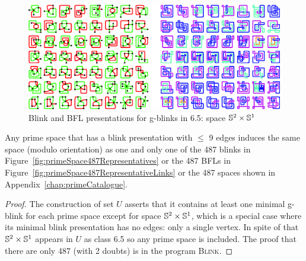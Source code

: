 \begin{figure}[h!tp]
   \begin{center}
      \leavevmode
      \includegraphics[width=14cm]{A.figs/gblinksfors1xs2inu.eps}
   \end{center}
   \vspace{-0.7cm}
   \caption{ Blink and BFL presentations for g-blinks in 6.5: space $\mathbb{S}^2 \times \mathbb{S}^1$}
   \label{fig:gblinksForS1xS2inU}
\end{figure}


\begin{Theo}
\label{theo:primeSpacesUpTo9Edges}
Any prime space that has a blink presentation with $\leq$ 9 edges induces the
same space (modulo orientation) as one and only one of the 487 blinks in
Figure~\ref{fig:primeSpace487Representatives} or the 487 BFLs in
Figure~\ref{fig:primeSpace487RepresentativeLinks} or the 487 spaces shown
in Appendix~\ref{chap:primeCatalogue}.
\end{Theo}

\enlargethispage{2cm}

\begin{proof}
The construction of set $U$ asserts that it contains at least one minimal
g-blink for each prime space except for space $\mathbb{S}^2 \times \mathbb{S}^1$,
which is a special case where its minimal blink presentation
has no edges: only a single vertex. In spite of that $\mathbb{S}^2 \times \mathbb{S}^1$
appears in $U$ as class 6.5 so any prime space is included. The proof
that there are only 487 (with 2 doubts) is in the program \textsc{Blink}.
\end{proof}



\newpage

